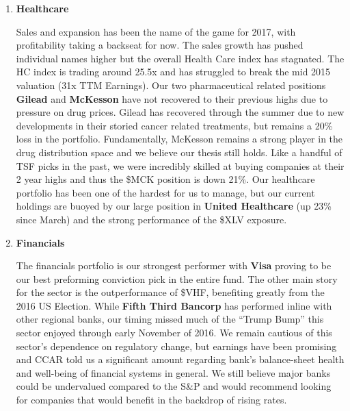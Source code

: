 \documentclass[11pt,pressrelease]{newlfm} %
\begin{document}
\begin{newlfm}
\begin{singlespace}
\begin{enumerate}
\item \textbf{Healthcare} \par
Sales and expansion has been the name of the game for 2017, with profitability taking a backseat for now. The sales growth has pushed individual names higher but the overall Health Care index has stagnated. The HC index is trading around 25.5x and has struggled to break the mid 2015 valuation (31x TTM Earnings). Our two pharmaceutical related positions \textbf{Gilead} and \textbf{McKesson} have not recovered to their previous highs due to pressure on drug prices. Gilead has recovered through the summer due to new developments in their storied cancer related treatments, but remains a 20\% loss in the portfolio. Fundamentally, McKesson remains a strong player in the drug distribution space and we believe our thesis still holds. Like a handful of TSF picks in the past, we were incredibly skilled at buying companies at their 2 year highs and thus the \$MCK position is down 21\%. Our healthcare portfolio has been one of the hardest for us to manage, but our current holdings are buoyed by our large position in \textbf{United Healthcare} (up 23\% since March) and the strong performance of the \$XLV exposure.

\item \textbf{Financials} \par
The financials portfolio is our strongest performer with \textbf{Visa} proving to be our best preforming conviction pick in the entire fund. The other main story for the sector is the outperformance of \$VHF, benefiting greatly from the 2016 US Election. While \textbf{Fifth Third Bancorp} has performed inline with other regional banks, our timing missed much of the ``Trump Bump'' this sector enjoyed through early November of 2016. We remain cautious of this sector's dependence on regulatory change, but earnings have been promising and CCAR told us a significant amount regarding bank's balance-sheet health and well-being of financial systems in general. We still believe major banks could be undervalued compared to the S\&P and would recommend looking for companies that would benefit in the backdrop of rising rates.


\end{enumerate}
\end{singlespace}
\end{newlfm}
\end{document}
